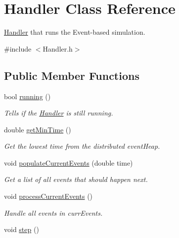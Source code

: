 \hypertarget{classHandler}{\section{\-Handler \-Class \-Reference}
\label{classHandler}
}


\hyperlink{classHandler}{\-Handler} that runs the \-Event-\/based simulation.  




{\ttfamily \#include $<$\-Handler.\-h$>$}

\subsection*{\-Public \-Member \-Functions}
\begin{DoxyCompactItemize}
\item 
bool \hyperlink{classHandler_a4639718d2f590ebd22d0d949a239327d}{running} ()
\begin{DoxyCompactList}\small\item\em \-Tells if the \hyperlink{classHandler}{\-Handler} is still running. \end{DoxyCompactList}\item 
double \hyperlink{classHandler_aa93dcd4a5dc2d1e2f10cec2ebe3a9668}{get\-Min\-Time} ()
\begin{DoxyCompactList}\small\item\em \-Get the lowest time from the distributed event\-Heap. \end{DoxyCompactList}\item 
void \hyperlink{classHandler_abc28c961d70d462106f2f3be46330930}{populate\-Current\-Events} (double time)
\begin{DoxyCompactList}\small\item\em \-Get a list of all events that should happen next. \end{DoxyCompactList}\item 
\hypertarget{classHandler_ad67c5bf3357aba8c6b71fa76c5161d29}{void \hyperlink{classHandler_ad67c5bf3357aba8c6b71fa76c5161d29}{process\-Current\-Events} ()}\label{classHandler_ad67c5bf3357aba8c6b71fa76c5161d29}

\begin{DoxyCompactList}\small\item\em \-Handle all events in curr\-Events. \end{DoxyCompactList}\item 
\hypertarget{classHandler_aa60626b419730f48a1bd5b91c9ade9d7}{void \hyperlink{classHandler_aa60626b419730f48a1bd5b91c9ade9d7}{step} ()}\label{classHandler_aa60626b419730f48a1bd5b91c9ade9d7}


\end{DoxyCompactItemize}
